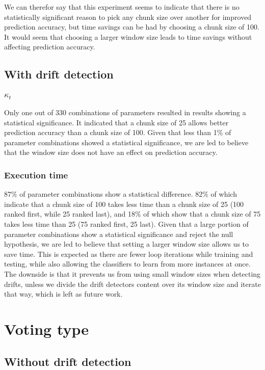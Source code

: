 We can therefor say that this experiment seems to indicate that there is no statistically significant reason to pick any chunk size over another for improved prediction accuracy, but time savings can be had by choosing a chunk size of 100. It would seem that choosing a larger window size leads to time savings without affecting prediction accuracy.

\subsection{With drift detection}

\subsubsection{$\kappa_t$}
Only one out of 330 combinations of parameters resulted in results showing a statistical significance. It indicated that a chunk size of 25 allows better prediction accuracy than a chunk size of 100. Given that less than 1\% of parameter combinations showed a statistical significance, we are led to believe that the window size does not have an effect on prediction accuracy.

\subsubsection{Execution time}
87\% of parameter combinations show a statistical difference. 82\% of which indicate that a chunk size of 100 takes less time than a chunk size of 25 (100 ranked first, while 25 ranked last), and 18\% of which show that a chunk size of 75 takes less time than 25 (75 ranked first, 25 last).
Given that a large portion of parameter combinations show a statistical significance and reject the null hypothesis, we are led to believe that setting a larger window size allows us to save time. This is expected as there are fewer loop iterations while training and testing, while also allowing the classifiers to learn from more instances at once. The downside is that it prevents us from using small window sizes when detecting drifts, unless we divide the drift detectors content over its window size and iterate that way, which is left as future work.

\section{Voting type}
\subsection{Without drift detection}
